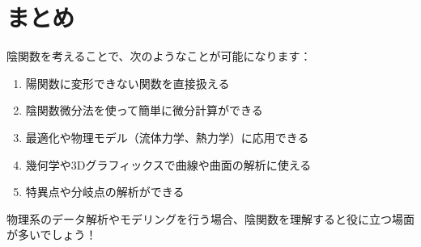 \documentclass{article}
\begin{document}
\section{まとめ}
陰関数を考えることで、次のようなことが可能になります：
\begin{enumerate}
    \item 陽関数に変形できない関数を直接扱える
    \item 陰関数微分法を使って簡単に微分計算ができる
    \item 最適化や物理モデル（流体力学、熱力学）に応用できる
    \item 幾何学や3Dグラフィックスで曲線や曲面の解析に使える
    \item 特異点や分岐点の解析ができる
\end{enumerate}

物理系のデータ解析やモデリングを行う場合、陰関数を理解すると役に立つ場面が多いでしょう！
\end{document}
